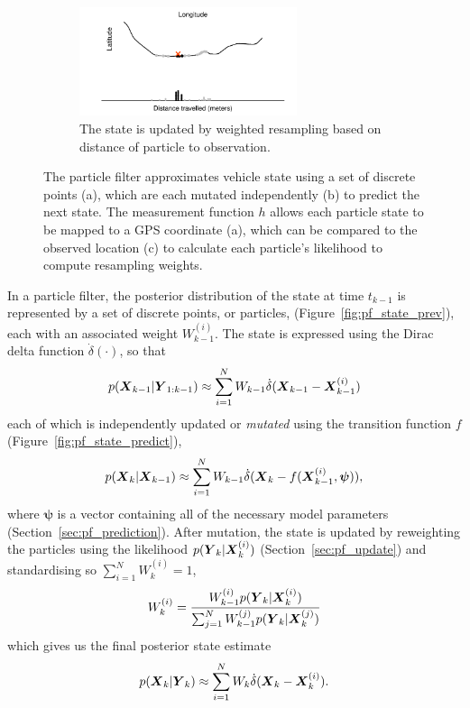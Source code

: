 \begin{figure}[p]
    \begin{subfigure}[t]{0.9\textwidth}
        \centering
        \includegraphics[width=0.7\textwidth]{figures/03_particle_filter_4.pdf}
        \caption{
            The state is updated by weighted resampling based on distance
            of particle to observation.
        }
        \label{fig:pf_state_predict2}
    \end{subfigure}
    \caption{
        The particle filter approximates vehicle state using a set of 
        discrete points (a), which are each mutated independently (b)
        to predict the next state.
        The measurement function $h$ allows each particle state
        to be mapped to a GPS coordinate (a),
        which can be compared to the observed location (c)
        to calculate each particle's likelihood to compute resampling weights.
    }
    \label{fig:pf_state}
\end{figure}

\afterpage{\clearpage}

In a particle filter, the posterior distribution of the state at time $t_{k-1}$
is represented by a set of discrete points, or particles, (Figure~\ref{fig:pf_state_prev}),
each with an associated weight $W_{k-1}^{(i)}$.
The state is expressed using the Dirac delta function $\dot\delta(\cdot)$,
so that
\begin{equation*}
p(\mbox{$\boldsymbol{X}$}_{k-1} | \mbox{$\boldsymbol{Y}$}_{1:k-1}) \approx 
    \sum_{i=1}^N W_{k-1} \dot\delta(\mbox{$\boldsymbol{X}$}_{k-1} - \mbox{$\boldsymbol{X}$}_{k-1}^{(i)})
\end{equation*}
each of which is independently updated or \emph{mutated} using the transition function $f$ (Figure~\ref{fig:pf_state_predict}),
\begin{equation*}
p(\mbox{$\boldsymbol{X}$}_k | \mbox{$\boldsymbol{X}$}_{k-1}) \approx 
    \sum_{i=1}^N W_{k-1} \dot\delta(\mbox{$\boldsymbol{X}$}_{k} - f(\mbox{$\boldsymbol{X}$}_{k-1}^{(i)}, \boldsymbol{\psi})),
\end{equation*}
where $\boldsymbol{\psi}$ is a vector containing all of the necessary model parameters
(Section~\ref{sec:pf_prediction}).
After mutation, 
the state is updated by reweighting the particles using the likelihood $p(\mbox{$\boldsymbol{Y}$}_k | \mbox{$\boldsymbol{X}$}_k^{(i)})$ 
(Section~\ref{sec:pf_update}) and standardising so $\sum_{i=1}^N W_k^{(i)} = 1$,
\begin{equation*}
W_k^{(i)} = \frac{W_{k-1}^{(i)} p(\mbox{$\boldsymbol{Y}$}_k | \mbox{$\boldsymbol{X}$}_k^{(i)})}{
    \sum_{j=1}^N W_{k-1}^{(j)} p(\mbox{$\boldsymbol{Y}$}_k | \mbox{$\boldsymbol{X}$}_k^{(j)})
}
\end{equation*}
which gives us the final posterior state estimate
\begin{equation*}
p(\mbox{$\boldsymbol{X}$}_k | \mbox{$\boldsymbol{Y}$}_k) \approx  
    \sum_{i=1}^N W_{k} \dot\delta(\mbox{$\boldsymbol{X}$}_{k} - \mbox{$\boldsymbol{X}$}_{k}^{(i)}).
\end{equation*}

